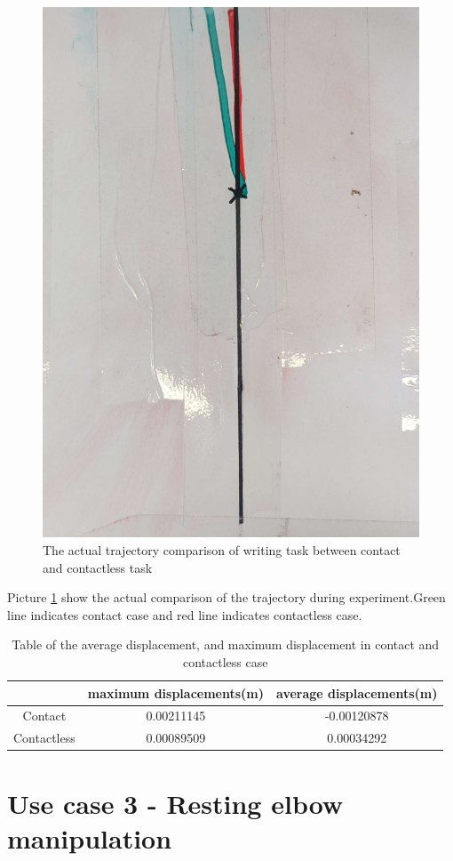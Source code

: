 \documentclass[report.tex]{subfiles}
\begin{document}
\begin{figure}[H]
    \captionsetup[figure]{justification=centering}
    \centering
    \includegraphics[width=0.5\linewidth]{images/us2_real_compare.jpg}
    \caption{The actual trajectory comparison of writing task between contact and contactless task }
    \label{fig:us2_traj_com_real}
\end{figure}
Picture \ref{fig:us2_traj_com_real} show the actual comparison of the trajectory during experiment.Green line indicates contact case and red line indicates contactless case.
\begin{table}[H]
    \centering
    \begin{tabular}{c|c|c|}
    \cline{2-3}
                                      & maximum displacements(m) & average displacements(m) \\ \hline
    \multicolumn{1}{|c|}{Contact}     &  0.00211145              & -0.00120878               \\ \hline
    \multicolumn{1}{|c|}{Contactless} &  0.00089509              &  0.00034292              \\ \hline
    \end{tabular}%
    \caption{Table of the average displacement, and maximum displacement in contact and contactless case}
    \label{tab:us2_displacement}
    \end{table}

\newpage
\section{Use case 3 - Resting elbow manipulation}
\label{us3}
\end{document}
